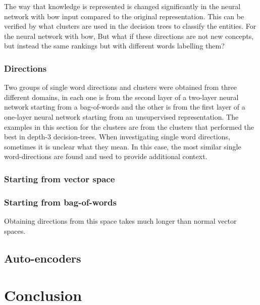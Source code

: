 The way that knowledge is represented is changed significantly in the neural network with bow input compared to the original representation. This can be verified by what clusters are used in the decision trees to classify the entities. For the neural network with bow, 
But what if these directions are not new concepts, but instead the same rankings but with different words labelling them?






\subsubsection{Directions}

Two groups of single word directions and clusters were obtained from three different domains, in each one is from the second layer of  a two-layer neural network starting from a bag-of-words and the other is from the first layer of a one-layer neural network starting from an unsupervised representation. The examples in this section for the clusters are from the clusters that performed the best in depth-3 decision-trees. When investigating single word directions, sometimes it is unclear what they mean. In this case, the most similar single word-directions are found and used to provide additional context.







\subsubsection{Starting from vector space}

\subsubsection{Starting from bag-of-words}

Obtaining directions from this space takes much longer than normal vector spaces.

\subsection{Auto-encoders}

\section{Conclusion}



